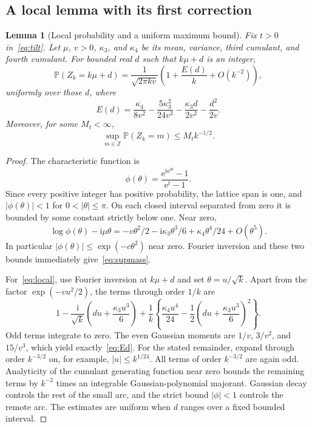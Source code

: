 \documentclass[11pt,a4paper]{article}
\numberwithin{equation}{section}
\newtheorem{lemma}[theorem]{Lemma}
\theoremstyle{remark}
\newcommand{\e}{\mathrm e}
\newcommand{\ii}{\mathrm i}
\newcommand{\Prob}{\mathbb P}
\begin{document}
\subsection{A local lemma with its first correction}
\begin{lemma}[Local probability and a uniform maximum bound]
\label{lem:local}
Fix $t>0$ in~\eqref{eq:tilt}. Let $\mu$, $v>0$, $\kappa_3$, and
$\kappa_4$ be its mean, variance, third cumulant, and fourth cumulant.
For bounded real $d$ such that $k\mu+d$ is an integer,
\begin{equation}\label{eq:local}
 \Prob(Z_k=k\mu+d)
 =\frac1{\sqrt{2\pi kv}}
    \left(1+\frac{E(d)}k+O(k^{-2})\right),
\end{equation}
uniformly over those $d$, where
\begin{equation}\label{eq:Ed}
 E(d)=\frac{\kappa_4}{8v^2}
      -\frac{5\kappa_3^2}{24v^3}
      -\frac{\kappa_3d}{2v^2}-\frac{d^2}{2v}.
\end{equation}
Moreover, for some $M_t<\infty$,
\begin{equation}\label{eq:supmass}
 \sup_{m\in\mathbb Z}\Prob(Z_k=m)\le M_t k^{-1/2}.
\end{equation}
\end{lemma}
\begin{proof}
The characteristic function is
\[
 \phi(\theta)=\frac{\e^{t\e^{\ii\theta}}-1}{\e^t-1}.
\]
Since every positive integer has positive probability, the lattice span
is one, and $|\phi(\theta)|<1$ for
$0<|\theta|\le\pi$. On each closed interval separated from zero it is
bounded by some constant strictly below one. Near zero,
\begin{equation}\label{eq:localexpansion}
 \log\phi(\theta)-\ii\mu\theta
 =-v\theta^2/2-\ii\kappa_3\theta^3/6
       +\kappa_4\theta^4/24+O(\theta^5).
\end{equation}
In particular $|\phi(\theta)|\le\exp(-c\theta^2)$ near zero. Fourier
inversion and these two bounds immediately give~\eqref{eq:supmass}.

For~\eqref{eq:local}, use Fourier inversion at $k\mu+d$ and set
$\theta=u/\sqrt{k}$. Apart from the factor $\exp(-vu^2/2)$, the terms
through order $1/k$ are
\[
 1-\frac{\ii}{\sqrt{k}}\left(du+\frac{\kappa_3u^3}{6}\right)
 +\frac1k\left\{\frac{\kappa_4u^4}{24}
     -\frac12\left(du+\frac{\kappa_3u^3}{6}\right)^2\right\}.
\]
Odd terms integrate to zero. The even Gaussian moments are
$1/v$, $3/v^2$, and $15/v^3$, which yield exactly~\eqref{eq:Ed}.
For the stated remainder, expand through order $k^{-3/2}$ on, for
example, $|u|\le k^{1/24}$. All terms of order $k^{-3/2}$ are again odd.
Analyticity of the cumulant generating function near zero bounds the
remaining terms by $k^{-2}$ times an integrable Gaussian-polynomial
majorant. Gaussian decay controls the rest of the small arc, and the
strict bound $|\phi|<1$ controls the remote arc. The estimates are uniform
when $d$ ranges over a fixed bounded interval.
\end{proof}
\end{document}
